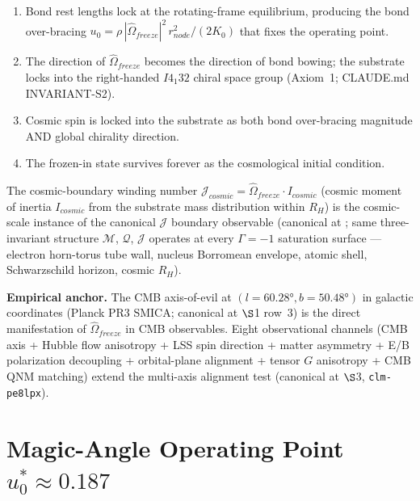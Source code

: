 \begin{enumerate}
    \item Bond rest lengths lock at the rotating-frame equilibrium, producing the bond over-bracing $u_0 = \rho\, |\hat{\Omega}_{freeze}|^2\, r_{node}^2 / (2 K_0)$ that fixes the operating point.
    \item The direction of $\hat{\Omega}_{freeze}$ becomes the direction of bond bowing; the substrate locks into the right-handed $I4_1 32$ chiral space group (Axiom~1; CLAUDE.md INVARIANT-S2).
    \item Cosmic spin is locked into the substrate as both bond over-bracing magnitude AND global chirality direction.
    \item The frozen-in state survives forever as the cosmological initial condition.
\end{enumerate}

The cosmic-boundary winding number $\mathcal{J}_{cosmic} = \hat{\Omega}_{freeze} \cdot I_{cosmic}$ (cosmic moment of inertia $I_{cosmic}$ from the substrate mass distribution within $R_H$) is the cosmic-scale instance of the canonical $\mathcal{J}$ boundary observable (canonical at ; same three-invariant structure $\mathcal{M}$, $\mathcal{Q}$, $\mathcal{J}$ operates at every $\Gamma = -1$\gammaundeclared{} saturation surface --- electron horn-torus tube wall, nucleus Borromean envelope, atomic shell, Schwarzschild horizon, cosmic $R_H$).

\textbf{Empirical anchor.} The CMB axis-of-evil at $(l = 60.28°, b = 50.48°)$ in galactic coordinates (Planck PR3 SMICA; canonical at  $\S$1 row~3) is the direct manifestation of $\hat{\Omega}_{freeze}$ in CMB observables. Eight observational channels (CMB axis + Hubble flow anisotropy + LSS spin direction + matter asymmetry + E/B polarization decoupling + orbital-plane alignment + tensor $G$ anisotropy + CMB QNM matching) extend the multi-axis alignment test (canonical at  $\S$3, \texttt{clm-pe8lpx}).

\section{Magic-Angle Operating Point $u_0^* \approx 0.187$}
\label{sec:vol9_cosmo_magic_angle}


